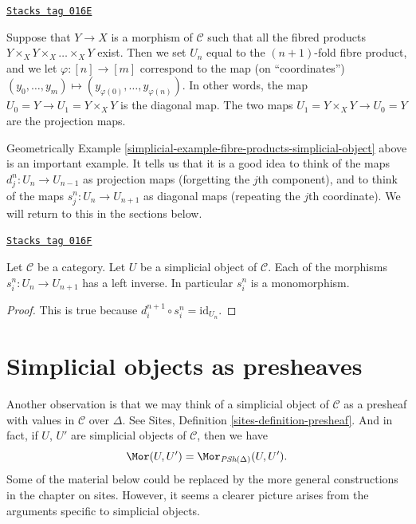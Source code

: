 \begin{example}
\label{simplicial-example-fibre-products-simplicial-object}
\href{https://stacks.math.columbia.edu/tag/016E}{\texttt{Stacks tag 016E}}

Suppose that $Y\to X$ is a morphism of $\mathcal{C}$ such that all
the fibred products $Y \times_X Y \times_X \ldots \times_X Y$ exist.
Then we set $U_n$ equal to the $(n + 1)$-fold fibre product,
and we let $\varphi : [n] \to [m]$ correspond to the map
(on ``coordinates'')
$(y_0, \ldots, y_m) \mapsto (y_{\varphi(0)}, \ldots, y_{\varphi(n)})$.
In other words, the map $U_0 = Y \to U_1 = Y \times_X Y$ is the
diagonal map. The two maps $U_1 = Y \times_X Y \to U_0 = Y$ are the
projection maps.
\end{example}

Geometrically Example \ref{simplicial-example-fibre-products-simplicial-object}
above is an important example. It tells us that it is a good
idea to think of the maps $d^n_j : U_n \to U_{n - 1}$
as projection maps (forgetting the $j$th component),
and to think of the maps $s^n_j : U_n \to U_{n + 1}$
as diagonal maps (repeating the $j$th coordinate).
We will return to this in the sections below.

\begin{lemma}[Si injective]
\label{simplicial-lemma-si-injective}
\href{https://stacks.math.columbia.edu/tag/016F}{\texttt{Stacks tag 016F}}

Let $\mathcal{C}$ be a category.
Let $U$ be a simplicial object of $\mathcal{C}$.
Each of the morphisms $s^n_i : U_n \to U_{n + 1}$
has a left inverse. In particular $s^n_i$ is a monomorphism.
\end{lemma}

\begin{proof}
This is true because $d_i^{n + 1} \circ s^n_i = \text{id}_{U_n}$.
\end{proof}

\section{Simplicial objects as presheaves}
\label{simplicial-section-simplicial-presheaves}
Another observation is that we may think of a simplicial
object of $\mathcal{C}$ as a presheaf with values in $\mathcal{C}$
over $\Delta$. See
Sites, Definition \ref{sites-definition-presheaf}.
And in fact, if $U$, $U'$ are simplicial objects
of $\mathcal{C}$, then we have
\begin{equation}
\label{equation-simplicial-set-presheaf}
\Mor(U, U') = \Mor_{\textit{PSh}(\Delta)}(U, U').
\end{equation}
Some of the material below could be replaced by the more
general constructions in the chapter on sites.
However, it seems a clearer picture arises from the
arguments specific to simplicial objects.

